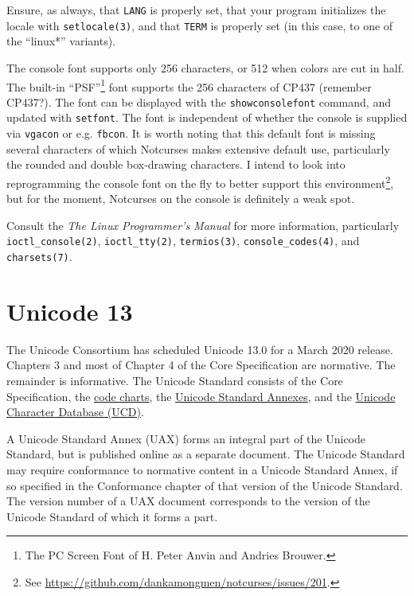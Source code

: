 \documentclass[letterpaper,10pt]{article}
\begin{document}
\begin{appendices}
Ensure, as always, that \texttt{LANG} is properly set, that your program
initializes the locale with \texttt{setlocale(3)}, and that \texttt{TERM} is
properly set (in this case, to one of the ``linux*'' variants).

The console font supports only 256 characters, or 512 when colors are cut in
half. The built-in ``PSF''\footnote{The PC Screen Font of H. Peter Anvin and
  Andries Brouwer.} font supports the 256 characters of CP437 (remember
CP437?). The font can be displayed with the \texttt{showconsolefont} command,
and updated with \texttt{setfont}. The font is independent of whether the
console is supplied via \texttt{vgacon} or e.g. \texttt{fbcon}. It is worth
noting that this default font is missing several characters of which Notcurses
makes extensive default use, particularly the rounded and double box-drawing
characters. I intend to look into reprogramming the console font on the fly to
better support this environment\footnote{See \url{https://github.com/dankamongmen/notcurses/issues/201}.},
but for the moment, Notcurses on the console is definitely a weak spot.

Consult the \textit{The Linux Programmer's Manual} for more information,
particularly
\texttt{ioctl\_console(2)}\cite{ioctlconsole},
\texttt{ioctl\_tty(2)}\cite{ioctltty},
\texttt{termios(3)}\cite{termios},
\texttt{console\_codes(4)}\cite{consolecodes},
and
\texttt{charsets(7)}\cite{charsets7}.

\cleardoublepage
\section{Unicode 13}
The Unicode Consortium has scheduled Unicode 13.0 for a March 2020 release.
Chapters 3 and most of Chapter 4 of the Core Specification are normative. The
remainder is informative. The Unicode Standard consists of the Core
Specification\cite{unicode13}, the \href{https://www.unicode.org/charts/}{code charts},
the \href{https://unicode.org/versions/Unicode13.0.0/#Unicode_Standard_Annexes_nb}{Unicode Standard Annexes},
and the \href{http://www.unicode.org/Public/13.0.0/}{Unicode Character Database (UCD)}.

A Unicode Standard Annex (UAX) forms an integral part of the Unicode Standard,
but is published online as a separate document. The Unicode Standard may
require conformance to normative content in a Unicode Standard Annex, if so
specified in the Conformance chapter of that version of the Unicode Standard.
The version number of a UAX document corresponds to the version of the Unicode
Standard of which it forms a part.


\end{appendices}
\end{document}
